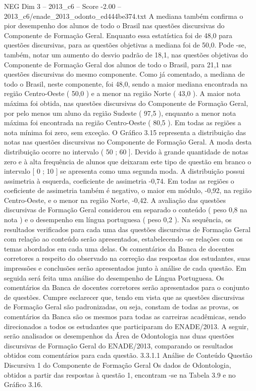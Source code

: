 \begin{textsample}{NEG Dim 3 – 2013\_c6 – Score -2.00 – 2013\_c6/enade\_2013\_odonto\_ed444be374.txt}
A mediana também confirma o pior desempenho dos alunos de todo o Brasil nas questões discursivas do Componente de Formação Geral.
Enquanto essa estatística foi de 48,0 para questões discursivas, para as questões objetivas a mediana foi de 50,0.
Pode -se, também, notar um aumento do desvio padrão de 18,1, nas questões objetivas do Componente de Formação Geral dos alunos de todo o Brasil, para 21,1 nas questões discursivas do mesmo componente.
Como já comentado, a mediana de todo o Brasil, neste componente, foi 48,0, sendo a maior mediana encontrada na região Centro-Oeste ( 50,0 ) e a menor na região Norte ( 43,0 ).
A maior nota máxima foi obtida, nas questões discursivas do Componente de Formação Geral, por pelo menos um aluno da região Sudeste ( 97,5 ), enquanto a menor nota máxima foi encontrada na região Centro-Oeste ( 80,5 ).
Em todas as regiões a nota mínima foi zero, sem exceção.
O Gráfico 3.15 representa a distribuição das notas nas questões discursivas no Componente de Formação Geral.
A moda desta distribuição ocorre no intervalo ( 50 ; 60 ].
Devido à grande quantidade de notas zero e à alta frequência de alunos que deixaram este tipo de questão em branco o intervalo [ 0 ; 10 ] se apresenta como uma segunda moda.
A distribuição possui assimetria à esquerda, coeficiente de assimetria -0,74.
Em todas as regiões o coeficiente de assimetria também é negativo, o maior em módulo, -0,92, na região Centro-Oeste, e o menor na região Norte, -0,42.
A avaliação das questões discursivas de Formação Geral considerou em separado o conteúdo ( peso 0,8 na nota ) e o desempenho em língua portuguesa ( peso 0,2 ).
Na sequência, os resultados verificados para cada uma das questões discursivas de Formação Geral com relação ao conteúdo serão apresentados, estabelecendo -se relações com os temas abordados em cada uma delas.
Os comentários da Banca de docentes corretores a respeito do observado na correção das respostas dos estudantes, suas impressões e conclusões serão apresentados junto à análise de cada questão.
Em seguida será feita uma análise do desempenho de Língua Portuguesa.
Os comentários da Banca de docentes corretores serão apresentados para o conjunto de questões.
Cumpre esclarecer que, tendo em vista que as questões discursivas de Formação Geral são padronizadas, ou seja, constam de todas as provas, os comentários da Banca são os mesmos para todas as carreiras acadêmicas, sendo direcionados a todos os estudantes que participaram do ENADE/2013.
A seguir, serão analisados os desempenhos da Área de Odontologia nas duas questões discursivas de Formação Geral do ENADE/2013, comparando os resultados obtidos com comentários para cada questão. 3.3.1.1 Análise de Conteúdo Questão Discursiva 1 do Componente de Formação Geral Os dados de Odontologia, obtidos a partir das respostas à questão 1, encontram -se na Tabela 3.9 e no Gráfico 3.16.

\end{textsample}
